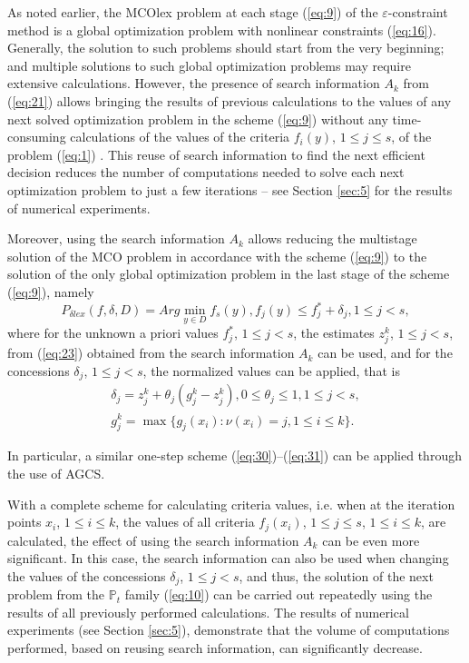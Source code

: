 \documentclass[smallextended]{svjour3}       %
\begin{document}
As noted earlier, the MCOlex problem at each stage (\ref{eq:9}) of the $\varepsilon$-constraint method is a global optimization problem with nonlinear constraints (\ref{eq:16}). Generally, the solution to such problems should start from the very beginning; and multiple solutions to such global optimization problems may require extensive calculations. However, the presence of search information $A_k$ from (\ref{eq:21}) allows bringing the results of previous calculations to the values of any next solved optimization problem in the scheme (\ref{eq:9}) without any time-consuming calculations of the values of the criteria $f_i (y)$, $1 \leq j \leq s$, of the problem (\ref{eq:1}) \cite{c30,c31}. This reuse of search information to find the next efficient decision reduces the number of computations needed to solve each next optimization problem to just a few iterations -- see Section \ref{sec:5} for the results of numerical experiments.

Moreover, using the search information $A_k$ allows reducing the multistage solution of the MCO problem in accordance with the scheme (\ref{eq:9}) to the solution of the only global optimization problem in the last stage of the scheme (\ref{eq:9}), namely
\begin{equation}\label{eq:30}
P_{\delta lex} (f,\delta,D)=Arg \min_{y \in D} {f_s(y)}, f_j(y)\leq f_j^* + \delta_j, 1 \leq j < s,
\end{equation}
where for the unknown a priori values $f_j^*$, $1 \leq j < s$, the estimates $z_j^k$, ${1 \leq j < s}$, from (\ref{eq:23}) obtained from the search information $A_k$ can be used, and for the concessions $\delta_j$, $1 \leq j < s$, the normalized values can be applied, that is
\begin{equation}\label{eq:31}
	\begin{matrix}
	\delta_j = z_j^k + \theta_j (g_j^k-z_j^k ), 0 \leq \theta_j \leq 1, 1 \leq j < s,\\
	g_j^k = \max{\{ g_j (x_i ) : \nu(x_i)=j, 1 \leq i \leq k \}}.
	\end{matrix}
\end{equation}

In particular, a similar one-step scheme (\ref{eq:30})--(\ref{eq:31}) can be applied through the use of AGCS.

With a complete scheme for calculating criteria values, i.e. when at the iteration points $x_i$, $1 \leq i \leq k$, the values of all criteria $f_j(x_i)$, $1 \leq j \leq s$, $1 \leq i \leq k$, are calculated, the effect of using the search information $A_k$ can be even more significant. In this case, the search information can also be used when changing the values of the concessions $\delta_j$, $1 \leq j < s$, and thus, the solution of the next problem from the $\mathbb{P}_t$ family (\ref{eq:10}) can be carried out repeatedly using the results of all previously performed calculations. The results of numerical experiments (see Section \ref{sec:5}), demonstrate that the volume of computations performed, based on reusing search information, can significantly decrease.
\end{document}
